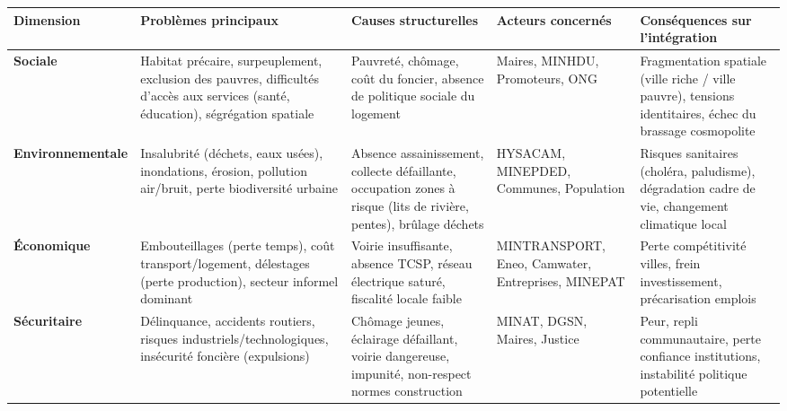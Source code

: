 \documentclass[11pt]{article}
\begin{document}
\begin{center}
\begin{tabularx}{\linewidth}{|l|X|X|X|X|}
\hline
\rowcolor{popblueL}
\textbf{Dimension} & \textbf{Problèmes principaux} & \textbf{Causes structurelles} & \textbf{Acteurs concernés} & \textbf{Conséquences sur l'intégration} \\
\hline
\textbf{Sociale} & Habitat précaire, surpeuplement, exclusion des pauvres, difficultés d'accès aux services (santé, éducation), ségrégation spatiale & Pauvreté, chômage, coût du foncier, absence de politique sociale du logement & Maires, MINHDU, Promoteurs, ONG & Fragmentation spatiale (ville riche / ville pauvre), tensions identitaires, échec du brassage cosmopolite \\
\hline
\textbf{Environnementale} & Insalubrité (déchets, eaux usées), inondations, érosion, pollution air/bruit, perte biodiversité urbaine & Absence assainissement, collecte défaillante, occupation zones à risque (lits de rivière, pentes), brûlage déchets & HYSACAM, MINEPDED, Communes, Population & Risques sanitaires (choléra, paludisme), dégradation cadre de vie, changement climatique local \\
\hline
\textbf{Économique} & Embouteillages (perte temps), coût transport/logement, délestages (perte production), secteur informel dominant & Voirie insuffisante, absence TCSP, réseau électrique saturé, fiscalité locale faible & MINTRANSPORT, Eneo, Camwater, Entreprises, MINEPAT & Perte compétitivité villes, frein investissement, précarisation emplois \\
\hline
\textbf{Sécuritaire} & Délinquance, accidents routiers, risques industriels/technologiques, insécurité foncière (expulsions) & Chômage jeunes, éclairage défaillant, voirie dangereuse, impunité, non-respect normes construction & MINAT, DGSN, Maires, Justice & Peur, repli communautaire, perte confiance institutions, instabilité politique potentielle \\
\hline
\end{tabularx}
\end{center}
\end{document}
